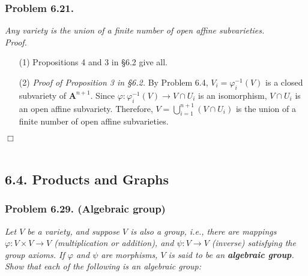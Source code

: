 \documentclass{article}
\begin{document}
\subsubsection*{Problem 6.21.}
\emph{Any variety is the union of a finite number of open affine subvarieties.} \\



\emph{Proof.}
\begin{enumerate}
\item[(1)]
  Propositions 4 and 3 in \S 6.2 give all.

\item[(2)]
  \emph{Proof of Proposition 3 in \S 6.2.}
  By Problem 6.4, $V_i = \varphi_i^{-1}(V)$ is a closed subvariety of $\mathbf{A}^{n+1}$.
  Since $\varphi: \varphi_i^{-1}(V) \to V \cap U_i$ is an isomorphism,
  $V \cap U_i$ is an open affine subvariety.
  Therefore, $V = \bigcup_{i=1}^{n+1} (V \cap U_i)$
  is the union of a finite number of open affine subvarieties.
\end{enumerate}
$\Box$ \\\\






\subsection*{6.4. Products and Graphs \\}



\subsubsection*{Problem 6.29. (Algebraic group)}
\emph{Let $V$ be a variety, and suppose $V$ is also a group, i.e.,
there are mappings $\varphi: V \times V \to V$ (multiplication or addition),
and $\psi: V \to V$ (inverse) satisfying the group axioms.
If $\varphi$ and $\psi$ are morphisms, $V$ is said to be an \textbf{algebraic group}.
Show that each of the following is an algebraic group:}
\end{document}
